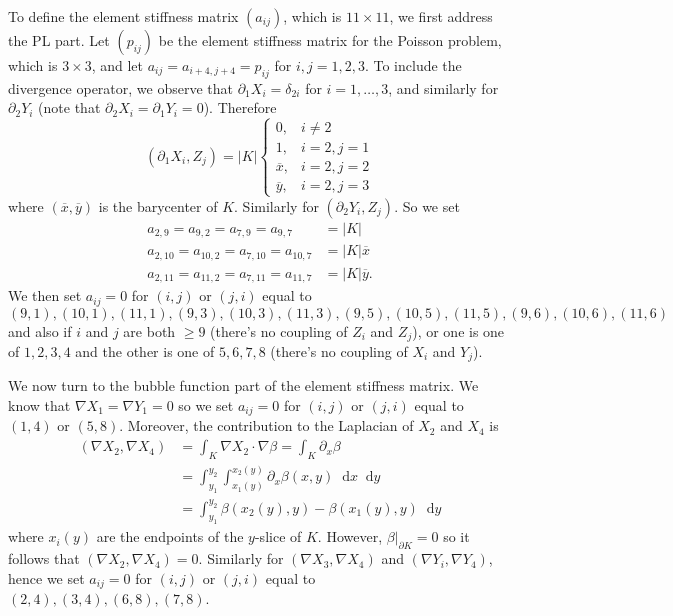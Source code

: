 \documentclass[10pt]{article}
\newcommand*\dif{\mathop{}\!\mathrm{d}}
\theoremstyle{definition}
\begin{document}
To define the element stiffness matrix $(a_{ij})$, which is $11 \times 11$, we first address the PL part.
Let $(p_{ij})$ be the element stiffness matrix for the Poisson problem, which is $3 \times 3$, and let $a_{ij} = a_{i+4,j+4} = p_{ij}$ for $i, j=1, 2, 3$.
To include the divergence operator, we observe that $\partial_1 X_i = \delta_{2i}$ for $i = 1, \dots, 3$, and similarly for $\partial_2 Y_i$ (note that $\partial_2 X_i = \partial_1 Y_i = 0$).
Therefore 
$$(\partial_1 X_i, Z_j) = |K|
\begin{cases}
    0, &i \neq 2 \\
    1, &i = 2, j = 1 \\
    \overline x, &i = 2, j = 2\\
    \overline y, &i = 2, j = 3
\end{cases}$$
where $(\overline x, \overline y)$ is the barycenter of $K$. Similarly for $(\partial_2 Y_i, Z_j)$. So we set
\begin{align*}
    a_{2,9} = a_{9,2} = a_{7,9} = a_{9,7} &= |K| \\
    a_{2,10} = a_{10,2} = a_{7,10} = a_{10,7} &= |K| \overline x \\
    a_{2,11} = a_{11,2} = a_{7,11} = a_{11,7} &= |K| \overline y.
\end{align*}
We then set $a_{ij} = 0$ for $(i, j)$ or $(j, i)$ equal to
$$ (9, 1), (10, 1), (11, 1), (9, 3), (10, 3), (11, 3), (9, 5), (10, 5), (11, 5), (9, 6), (10, 6), (11, 6)$$
and also if $i$ and $j$ are both $\geq 9$ (there's no coupling of $Z_i$ and $Z_j$), or one is one of $1,2,3,4$ and the other is one of $5,6,7,8$ (there's no coupling of $X_i$ and $Y_j$).

We now turn to the bubble function part of the element stiffness matrix.
We know that $\nabla X_1 = \nabla Y_1 = 0$ so we set $a_{ij} = 0$ for $(i,j)$ or $(j,i)$ equal to $(1, 4)$ or $(5, 8)$.
Moreover, the contribution to the Laplacian of $X_2$ and $X_4$ is 
\begin{align*}
    (\nabla X_2, \nabla X_4) &= \int_K \nabla X_2 \cdot \nabla \beta = \int_K \partial_x \beta \\
    &= \int_{y_1}^{y_2} \int_{x_1(y)}^{x_2(y)} \partial_x \beta(x, y) \dif x \dif y \\
    &= \int_{y_1}^{y_2} \beta(x_2(y), y) - \beta(x_1(y), y) \dif y
\end{align*}
where $x_i(y)$ are the endpoints of the $y$-slice of $K$. However, $\beta|_{\partial K} = 0$ so it follows that $(\nabla X_2, \nabla X_4) = 0$.
Similarly for $(\nabla X_3, \nabla X_4)$ and $(\nabla Y_i, \nabla Y_4)$, hence we set $a_{ij} = 0$ for $(i,j)$ or $(j,i)$ equal to $(2, 4), (3, 4), (6, 8), (7, 8)$.
\end{document}
